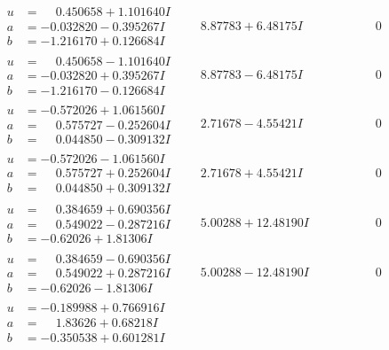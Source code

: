 \documentclass[1p]{elsarticle_modified}
\theoremstyle{definition}
\begin{document}
$$\begin{array}{c|c|c}
\begin{aligned}
u &= \phantom{-}0.450658 + 1.101640 I \\
a &= -0.032820 - 0.395267 I \\
b &= -1.216170 + 0.126684 I\end{aligned}
 & \phantom{-}8.87783 + 6.48175 I & \phantom{-0.000000 } 0 \\ \hline\begin{aligned}
u &= \phantom{-}0.450658 - 1.101640 I \\
a &= -0.032820 + 0.395267 I \\
b &= -1.216170 - 0.126684 I\end{aligned}
 & \phantom{-}8.87783 - 6.48175 I & \phantom{-0.000000 } 0 \\ \hline\begin{aligned}
u &= -0.572026 + 1.061560 I \\
a &= \phantom{-}0.575727 - 0.252604 I \\
b &= \phantom{-}0.044850 - 0.309132 I\end{aligned}
 & \phantom{-}2.71678 - 4.55421 I & \phantom{-0.000000 } 0 \\ \hline\begin{aligned}
u &= -0.572026 - 1.061560 I \\
a &= \phantom{-}0.575727 + 0.252604 I \\
b &= \phantom{-}0.044850 + 0.309132 I\end{aligned}
 & \phantom{-}2.71678 + 4.55421 I & \phantom{-0.000000 } 0 \\ \hline\begin{aligned}
u &= \phantom{-}0.384659 + 0.690356 I \\
a &= \phantom{-}0.549022 - 0.287216 I \\
b &= -0.62026 + 1.81306 I\end{aligned}
 & \phantom{-}5.00288 + 12.48190 I & \phantom{-0.000000 } 0 \\ \hline\begin{aligned}
u &= \phantom{-}0.384659 - 0.690356 I \\
a &= \phantom{-}0.549022 + 0.287216 I \\
b &= -0.62026 - 1.81306 I\end{aligned}
 & \phantom{-}5.00288 - 12.48190 I & \phantom{-0.000000 } 0 \\ \hline\begin{aligned}
u &= -0.189988 + 0.766916 I \\
a &= \phantom{-}1.83626 + 0.68218 I \\
b &= -0.350538 + 0.601281 I\end{aligned}

\end{array}$$
\end{document}
